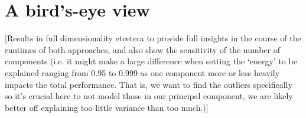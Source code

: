 %
%
%

\section{A bird's-eye view}
\label{sec:parti_analysisbird}

[Results in full dimensionality etcetera to provide full insights in the course of the runtimes of both approaches, and also show the sensitivity of the number of components (i.e. it might make a large difference when setting the `energy' to be explained ranging from 0.95 to 0.999 as one component more or less heavily impacts the total performance. That is, we want to find the outliers specifically so it's crucial here to not model those in our principal component, we are likely better off explaining too little variance than too much.)]\\

